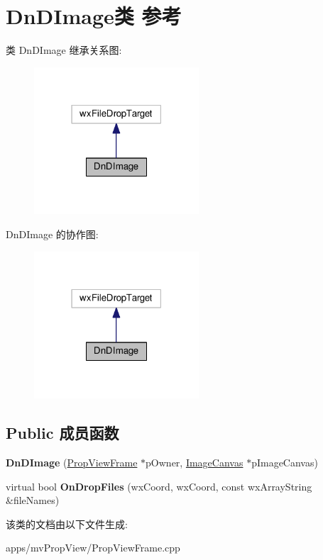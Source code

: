 \hypertarget{class_dn_d_image}{\section{Dn\+D\+Image类 参考}
\label{class_dn_d_image}
}


类 Dn\+D\+Image 继承关系图\+:
\nopagebreak
\begin{figure}[H]
\begin{center}
\leavevmode
\includegraphics[width=174pt]{class_dn_d_image__inherit__graph}
\end{center}
\end{figure}


Dn\+D\+Image 的协作图\+:
\nopagebreak
\begin{figure}[H]
\begin{center}
\leavevmode
\includegraphics[width=174pt]{class_dn_d_image__coll__graph}
\end{center}
\end{figure}
\subsection*{Public 成员函数}
\begin{DoxyCompactItemize}
\item 
\hypertarget{class_dn_d_image_a44cd2775825e84ea3bf9d23aafc16695}{{\bfseries Dn\+D\+Image} (\hyperlink{class_prop_view_frame}{Prop\+View\+Frame} $\ast$p\+Owner, \hyperlink{class_image_canvas}{Image\+Canvas} $\ast$p\+Image\+Canvas)}\label{class_dn_d_image_a44cd2775825e84ea3bf9d23aafc16695}

\item 
\hypertarget{class_dn_d_image_ac80f28a720fd3cb5337674192decd009}{virtual bool {\bfseries On\+Drop\+Files} (wx\+Coord, wx\+Coord, const wx\+Array\+String \&file\+Names)}\label{class_dn_d_image_ac80f28a720fd3cb5337674192decd009}

\end{DoxyCompactItemize}


该类的文档由以下文件生成\+:\begin{DoxyCompactItemize}
\item 
apps/mv\+Prop\+View/Prop\+View\+Frame.\+cpp\end{DoxyCompactItemize}
